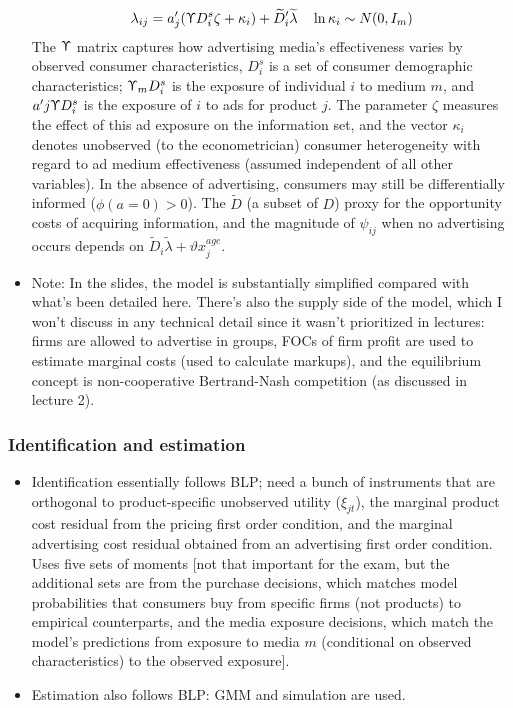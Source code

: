 \documentclass[11pt]{article}
\numberwithin{equation}{section}
\begin{document}
\begin{itemize}
		\begin{equation}
		\lambda_{ij}=a_j'(\Upupsilon D_i^s\zeta + \kappa_i) + \widetilde{D}_i'\widetilde{\lambda}\quad \ln\kappa_i \sim N(0,I_m)
		\end{equation}
		The $\Upupsilon$ matrix captures how advertising media's effectiveness varies by observed consumer characteristics, $D^s_i$ is a set of consumer demographic characteristics; $\Upupsilon_m D_i^s$ is the exposure of individual $i$ to medium $m$, and $a'j\Upupsilon D_i^s$ is the exposure of $i$ to ads for product $j$. The parameter $\zeta$ measures the effect of this ad exposure on the information set, and the vector $\kappa_i$  denotes unobserved (to the econometrician) consumer heterogeneity with regard to ad medium effectiveness (assumed independent of all other variables). In the absence of advertising, consumers may still be differentially informed ($\phi(a=0)>0$). The $\widetilde{D}$ (a subset of $D$) proxy for the opportunity costs of acquiring information, and the magnitude of $\psi_{ij}$ when no advertising occurs depends on $\widetilde{D}_i\widetilde{\lambda}+\vartheta x_j^{age}$.
		\item Note: In the slides, the model is substantially simplified compared with what's been detailed here. There's also the supply side of the model, which I won't discuss in any technical detail since it wasn't prioritized in lectures: firms are allowed to advertise in groups, FOCs of firm profit are used to estimate marginal costs (used to calculate markups), and the equilibrium concept is non-cooperative Bertrand-Nash competition (as discussed in lecture 2).
		\end{itemize}
			\subsubsection*{Identification and estimation}
		\begin{itemize}
			\item Identification essentially follows BLP; need a bunch of instruments that are orthogonal to product-specific unobserved utility ($\xi_{jt}$), the marginal product cost residual from the pricing first order condition, and the marginal advertising cost residual obtained from an advertising first order condition. Uses five sets of moments [not that important for the exam, but the additional sets are from the purchase decisions, which matches model probabilities that consumers buy from specific firms (not products) to empirical counterparts, and the media exposure decisions, which match the model's predictions from exposure to media $m$ (conditional on observed characteristics) to the observed exposure].
			\item Estimation also follows BLP: GMM and simulation are used.

		\end{itemize}
\end{document}
